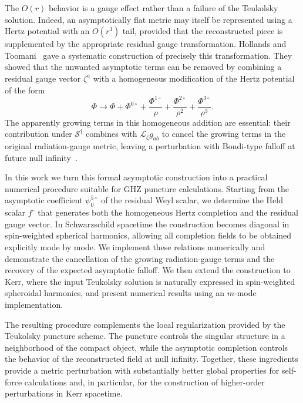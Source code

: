 \documentclass[preprint,aps,nofootinbib,a4paper,superscriptaddress,longbibliography,amsfonts, amssymb,amsmath,titlepage]{revtex4-1}
\numberwithin{equation}{section} %
\newcommand{\emm}{m}
\renewcommand{\S}{{\mathcal S}}
\newcommand{\Lie}{{\mathcal L}}
\def\fHo{f^{\circ}}
\newcommand{\PhiN}[1]{\Phi^{#1\circ}}
\def\psifive{\psi^{5\circ}_{0}}
\begin{document}
The $O(r)$ behavior is a gauge effect rather than a failure of the
Teukolsky solution.  Indeed, an asymptotically flat metric may itself
be represented using a Hertz potential with an $O(r^3)$ tail, provided
that the reconstructed piece is supplemented by the appropriate
residual gauge transformation.  Hollands and Toomani~\cite{Hollands:2024iqp} gave a
systematic construction of precisely this transformation.  They showed that the
unwanted asymptotic terms can be removed by combining a residual gauge
vector $\zeta^a$ with a homogeneous modification of the Hertz
potential of the form
\begin{equation}\label{eq:Phi completion intro}
\Phi
\longrightarrow
\Phi
+
\PhiN{0}
+
\frac{\PhiN{1}}{\rho}
+
\frac{\PhiN{2}}{\rho^2}
+
\frac{\PhiN{3}}{\rho^3}.
\end{equation}
The apparently growing terms in this homogeneous addition are essential:
their contribution under $\S^{\dagger}$ combines with
$\Lie_{\zeta}g_{ab}$ to cancel the growing terms in the original
radiation-gauge metric, leaving a perturbation with Bondi-type falloff
at future null infinity~\cite{Hollands:2024iqp}.

In this work we turn this formal asymptotic construction into a
practical numerical procedure suitable for GHZ puncture calculations.
Starting from the asymptotic coefficient $\psifive$ of the
residual Weyl scalar, we determine the Held scalar $\fHo$ that
generates both the homogeneous Hertz completion and the residual gauge
vector.  In Schwarzschild spacetime the construction becomes diagonal
in spin-weighted spherical harmonics, allowing all completion fields to
be obtained explicitly mode by mode.  We implement these relations
numerically and demonstrate the cancellation of the growing
radiation-gauge terms and the recovery of the expected asymptotic
falloff.  We then extend the construction to Kerr, where the input
Teukolsky solution is naturally expressed in spin-weighted spheroidal
harmonics, and present numerical results using an $\emm$-mode
implementation.

The resulting procedure complements the local regularization provided
by the Teukolsky puncture scheme.  The puncture controls the singular
structure in a neighborhood of the compact object, while the
asymptotic completion controls the behavior of the reconstructed field
at null infinity.  Together, these ingredients provide a metric
perturbation with substantially better global properties for
self-force calculations and, in particular, for the construction of
higher-order perturbations in Kerr spacetime.
\end{document}

